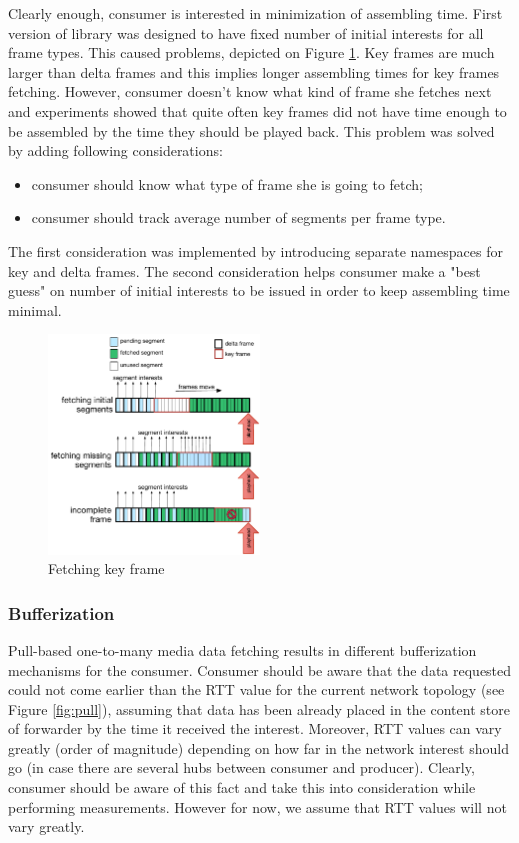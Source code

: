 \documentclass[10pt]{proc}
\begin{document}
Clearly enough, consumer is interested in minimization of assembling time. First version of library was designed to have fixed number of initial interests for all frame types. This caused problems, depicted on Figure \ref{fig:fetch-key}. Key frames are much larger than delta frames and this implies longer assembling times for key frames fetching. However, consumer doesn't know what kind of frame she fetches next and experiments showed that quite often key frames did not have time enough to be assembled by the time they should be played back. This problem was solved by adding following considerations:
\begin{itemize}
\item consumer should know what type of frame she is going to fetch;
\item consumer should track average number of segments per frame type.
\end{itemize}

The first consideration was implemented by introducing separate namespaces for key and delta frames. The second consideration helps consumer make a "best guess" on number of initial interests to be issued in order to keep assembling time minimal.

\begin{figure}[Ht!]
\centering
\includegraphics[width=0.5\textwidth]{key-fetch}
\caption{Fetching key frame}
\label{fig:fetch-key}
\end{figure}


\subsubsection{Bufferization}

Pull-based one-to-many media data fetching results in different bufferization mechanisms for the consumer. Consumer should be aware that the data requested could not come earlier than the RTT value for the current network topology (see Figure \ref{fig:pull}), assuming that data has been already placed in the content store of forwarder by the time it received the interest. Moreover, RTT values can vary greatly (order of magnitude) depending on how far in the network interest should go (in case there are several hubs between consumer and producer). Clearly, consumer should be aware of this fact and take this into consideration while performing measurements. However for now, we assume that RTT values will not vary greatly.
\end{document}
